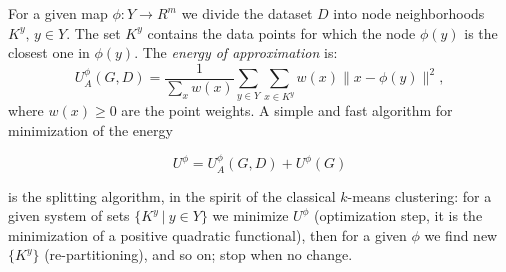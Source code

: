 \documentclass[graybox]{archivesofdatascience}
\begin{document}
For a given map $\phi: Y \to R^m$ we divide the dataset $D$ into
node neighborhoods $K^y, \, y\in Y$. The set $K^y$ contains the data points for
which the node $\phi(y)$ is the closest one in $\phi(y)$. The {\it
energy of approximation} is:
\begin{equation}\label{standardApproximationTerm}
U^{\phi}_A(G,D)= \frac{1}{\sum_{x} w(x)}\sum_{y \in Y} \sum_{ x \in K^y} w(x) \|x-
\phi(y)\|^2,
\end{equation}
where $w(x) \geq 0$ are the point weights. A simple and fast algorithm for minimization of the energy

\begin{equation}\label{globalStandardEnergy}
U^{\phi}=U^{\phi}_A(G,D)+U^{\phi}{(G)}
\end{equation}


\noindent is the splitting algorithm, in the spirit of the classical $k$-means clustering: for a given
system of sets $\{K^y \ | \ y \in Y \}$ we minimize $U^{\phi}$ (optimization step, it
is the minimization of a positive quadratic functional), then for a
given $\phi$ we find new $\{K^y\}$ (re-partitioning), and so on; stop when no change.

\iffalse
The next problem is the elastic graph construction. Here we should
find a compromise between simplicity of graph topology, simplicity
of geometrical form for a given topology, and accuracy of
approximation \citep{zinovyev2013data}. Geometrical complexity is measured by the graph
energy $U^{\phi}{(G)}$, and the error of approximation is measured
by the energy of approximation $U^{\phi}_A(G,D)$. Both are
included in the energy $U^{\phi}$. Topological or construction complexity will be
represented by means of elementary transformations: it is the
length of the energetically optimal chain of elementary
transformation from a given set applied to initial simple graph.

The graph grammars \citep{Nagl,Loewe} provide a well-developed
formalism for the description of elementary graph transformations. An
elastic graph grammar is presented as a set of production (or
substitution) rules. Each rule has a form $A \to B$, where $A$ and
$B$ are elastic graphs. When this rule is applied to an elastic
graph, a copy of $A$ is removed from the graph together with all its
incident edges and is replaced with a copy of $B$ with edges that
connect $B$ to graph. For a full description of this language we
need the notion of a {\it labeled graph}. Labels are necessary to
provide the proper connection between $B$ and the graph.
\fi
\end{document}

